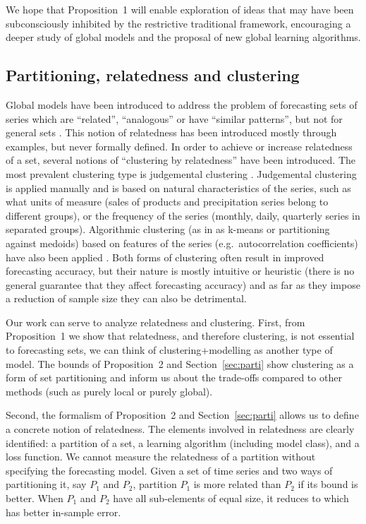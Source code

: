 \documentclass[a4paper]{article}
\theoremstyle{custom}
\begin{document}
We hope that Proposition~1 will enable exploration of ideas that may have been subconsciously inhibited by the restrictive traditional framework, encouraging a deeper study of global models and the proposal of new global learning algorithms.

\subsection{Partitioning, relatedness and clustering}
\label{sec:relatparti}

Global models have been introduced to address the problem of forecasting sets of series which are ``related'', ``analogous'' or have ``similar patterns'', but not for general sets \cite{duncan2001forecasting, salinas2019DeepAR, bandara2020cluster}. This notion of relatedness has been introduced mostly through examples, but never formally defined. In order to achieve or increase relatedness of a set, several notions of ``clustering by relatedness'' have been introduced.
The most prevalent clustering type is judgemental clustering \cite{duncan2001forecasting}. Judgemental clustering is applied manually and is based on natural characteristics of the series, such as what units of measure (sales of products and precipitation series belong to different groups), or the frequency of the series (monthly, daily, quarterly series in separated groups). Algorithmic clustering (as in as k-means or partitioning against medoids) based on features of the series (e.g.\ autocorrelation coefficients) have also been applied \cite{bandara2020cluster}. Both forms of clustering often result in improved forecasting accuracy, but their nature is mostly intuitive or heuristic (there is no general guarantee that they affect forecasting accuracy) and as far as they impose a reduction of sample size they can also be detrimental.

Our work can serve to analyze relatedness and clustering.
First, from Proposition~1 we show that relatedness, and therefore clustering, is not essential to forecasting sets, we can think of clustering+modelling as another type of model. The bounds of Proposition~2 and Section~\ref{sec:parti} show clustering as a form of set partitioning and inform us about the trade-offs compared to other methods (such as purely local or purely global).

Second, the formalism of Proposition~2 and Section~\ref{sec:parti} allows us to define a concrete notion of relatedness. The elements involved in relatedness are clearly identified: a partition of a set, a learning algorithm (including model class), and a loss function. We cannot measure the relatedness of a partition without specifying the forecasting model. Given a set of time series and two ways of partitioning it, say $P_1$ and $P_2$, partition $P_1$ is more related than $P_2$ if its bound is better. When $P_1$ and $P_2$ have all sub-elements of equal size, it reduces to which has better in-sample error.
\end{document}
